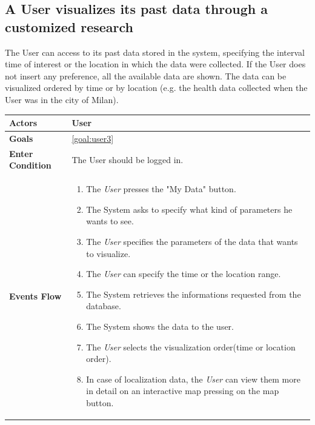  \subsection{A User visualizes its past data through a customized research}
 
The User can access to its past data stored in the system, specifying the interval time of interest or the location in which the data were collected. If the User does not insert any preference, all the available data are shown.
The data can be visualized ordered by time or by location (e.g. the health data collected when the User was in the city of Milan).

\begin{table}[H]
	\centering
    
    \begin{tabular}{|p{3.5cm}|p{10.3cm}|}
    
    \hline
    \textbf{\large{Actors}} & User \\		 			
    \hline    \textbf{\large{Goals}} 				&\ref{goal:user3}\\
    
     \hline
     
    \textbf{\large{Enter Condition}} & The User should be logged in.\\
    
    \hline
    \textbf{\large{Events Flow}}		& \begin{enumerate}[leftmargin=0.5cm]
                                          	\item The \emph{User}  presses the "My Data" button.
                                            \item The System asks to specify what kind of parameters he wants to see.
                                            \item The \emph{User} specifies the parameters of the data that wants to visualize.
                                            \item The \emph{User} can specify the time or the location range. 
                                            \item The System retrieves the informations requested from the database.
                                            \item The System shows the data to the user.
                                            \item The \emph{User} selects the visualization order(time or location order).
                                            \item In case of localization data, the \emph{User} can view them more in detail on an interactive map pressing on the map button.            \end{enumerate}\\
                                            

\end{tabular}
\end{table}

